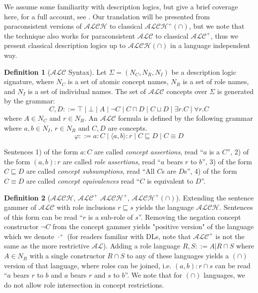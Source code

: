 \documentclass[letterpaper]{article} %
\theoremstyle{definition}
\theoremstyle{definition}
\newtheorem{definition}{Definition}
\theoremstyle{definition}
\theoremstyle{definition}
\theoremstyle{definition}
\newcommand{\isa}{\mathbin{{:}}}
\begin{document}
We assume some familiarity with description logics, but give a brief coverage here, for a full account, see \cite{DBLP:conf/dlog/2003handbook}. Our translation will be presented from paraconsistent versions of $\mathcal{ALCH}$ to classical $\mathcal{ALCH^+(\cap)}$, but we note that the technique also works for paraconsistent $\mathcal{ALC}$ to classical $\mathcal{ALC^+}$, thus we present classical description logics up to $\mathcal{ALCH(\cap)}$ in a language independent way.
\begin{definition}[$\mathcal{ALC}$ Syntax] 
Let $\Sigma=(N_C,N_R,N_I)$ be a description logic signature, where $N_C$ is a set of atomic concept names, $N_R$ is a set of role names, and $N_I$ is a set of individual names. The set of $\mathcal{ALC}$ concepts over $\Sigma$ is generated by the grammar:
\[
C,D ::= \top \mid \bot \mid A \mid \lnot C \mid C\sqcap D
\mid C\sqcup D \mid \exists r.C \mid \forall r.C
\]
where $A\in N_C$ and $r\in N_R$. An $\mathcal{ALC}$ formula is defined by the following grammar where $a, b \in N_I$, $r \in N_R$ and $C, D$ are concepts. 
\[
\varphi ::= a \isa C \mid \langle a, b \rangle \isa r \mid C \sqsubseteq D \mid C \equiv D
\] 
\end{definition}
\noindent Sentences 1) of the form $a \isa C$ are called {\it concept assertions}, read ``$a$ is a $C$'',
2) of the form $(a, b) \isa r$ are called {\it role assertions}, read ``$a$ bears $r$ to $b$'', 3) of the form $C \sqsubseteq D$ are called {\it concept subsumptions}, read ``All $C$s are $D$s'', 4) of the form $C \equiv D$ are called {\it concept equivalences} read ``$C$ is equivalent to $D$''.

\begin{definition}[$\mathcal{ALCH}$, $\mathcal{ALC}^+$ $\mathcal{ALCH^+}$, $\mathcal{ALCH^+(\cap)}$]
Extending the sentence gammer of $\mathcal{ALC}$ with role inclusions $r \sqsubseteq s$ yields the language $\mathcal{ALCH}$. Sentences of this form can be read ``$r$ is a sub-role of $s$''. Removing the negation concept constructor $\lnot C$ from the concept gammer yields "positive version" of the language which we denote $\cdot^+$ (for readers familiar with DLs, note that $\mathcal{ALC^+}$ is not the same as the more restrictive $\mathcal{AL}$). Adding a role language $R,S::= A |R \sqcap S$ where $A \in N_R$ with a single constructor $R \cap S$ to any of these languages yields a $(\cap)$ version of that language, where roles can be joined, i.e. $(a, b) \isa r \cap s$ can be read ``$a$ bears $r$ to $b$ and $a$ bears $r$ and $s$ to $b$''. We note that for $(\cap)$ languages, we do not allow role intersection in concept restrictions.
\end{definition}
\end{document}
